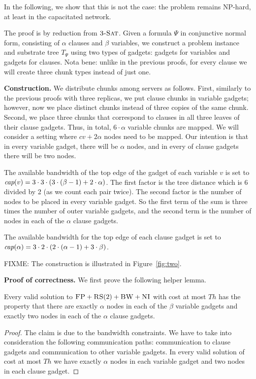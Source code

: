 \documentclass[9pt,twocolumn]{scrartcl}
\newcommand{\clauses}{\alpha}
\newcommand{\vars}{\beta}
\newcommand{\capa}{\emph{cap}}
\newcommand{\CC}{\textsc{NI}}
\newcommand{\FP}{\textsc{FP}}
\newcommand{\RS}{\textsc{RS}}
\newcommand{\BW}{\textsc{BW}}
\newcommand{\TSAT}{\textsc{3-Sat}}
\newcommand{\Formula}{\ensuremath{\Psi}}
\newcommand{\Thr}{\ensuremath{Th}}
\begin{document}
\begin{appendix}
In the following, we show that this is not the case: the problem remains
NP-hard, at least in the capacitated network.

The proof is by reduction from $\TSAT$. Given a formula $\Formula$ in
conjunctive normal form, consisting of $\clauses$ clauses and $\vars$ variables, we construct a problem instance and substrate tree
$T_{\Formula}$ using two types of gadgets: gadgets for variables and
gadgets for clauses. Nota bene:
unlike in the previous proofs, for every clause we will create three chunk types instead of just one.

\textbf{Construction.}
We distribute chunks among servers as follows. First,
similarly to the previous proofs with three replicas, we put clause chunks in
variable gadgets; however, now we place distinct chunks instead of
three copies of the same chunk. Second, we place three chunks that
correspond to clauses in all three leaves of their clause gadgets.
Thus, in total, $6 \cdot \clauses$ variable chunks are mapped.
We will consider a setting where $cv + 2\clauses$ nodes need to be mapped. Our intention is that in
every variable gadget, there will be $\clauses$ nodes,
 and in every of clause
gadgets there will be two nodes.

The available bandwidth of the top edge of the gadget of each variable $v$ is set to
$\capa(v) = 3  \cdot  3  \cdot  (3  \cdot  (\vars - 1) + 2  \cdot  \clauses) $.
The first factor is the tree distance which is 6 divided by 2 (as
we count each pair twice). The second factor is
the number of nodes to be placed in every variable gadget.
So the first term of the
sum is three times the number of outer variable gadgets,
and the second term is the
number of nodes in each of the $\clauses$ clause gadgets.

The available bandwidth for the top edge of each clause gadget is set to
$\capa(\clauses) = 3  \cdot  2  \cdot  (2  \cdot  (\clauses - 1) + 3  \cdot  \vars) $.

FIXME: The construction is illustrated in Figure~\ref{fig:two}.


\textbf{Proof of correctness.}
We first prove the following helper lemma.
\begin{lemma}
Every valid solution to $\FP+\RS(2)+\BW+\CC$
with cost at most $\Thr$ has the property that
there are exactly $\clauses$ nodes in each of the $\vars$ variable gadgets
and exactly two nodes in each of the $\clauses$ clause gadgets.
\end{lemma}
\begin{proof}
The claim is due to the bandwidth constraints. We have to take into
consideration the following communication paths:
communication to clause gadgets and
communication to
other variable gadgets.
In every valid solution of cost at most $\Thr$ we have exactly
$\clauses$ nodes in each variable gadget and two nodes in each clause gadget.
\end{proof}


\end{appendix}
\end{document}
